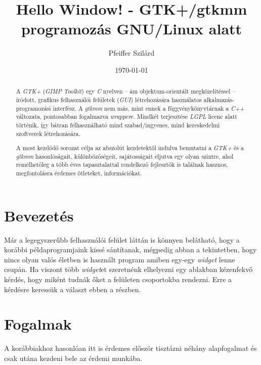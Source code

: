 \documentclass[a4paper,10pt]{article}
\title{Hello Window! - GTK+/gtkmm programozás GNU/Linux alatt}
\author{Pfeiffer Szilárd}
\date{\today}
\begin{document}

\begin{titlepage}

\maketitle

\begin{abstract}
A \textit{GTK+} (\textit{GIMP Toolkit}) egy \textit{C} nyelven -- ám objektum-orientált megközelítéssel -- íródott, grafikus felhasználói felületek (\textit{GUI}) létrehozására használatos alkalmazás-programozási interfész. A \textit{gtkmm} nem más, mint ennek a függvénykönyvtárnak a \textit{C++} változata, pontosabban fogalmazva \textit{wrapper}e. Mindkét terjesztése \textit{LGPL} licenc alatt történik, így bátran felhasználható mind szabad/ingyenes, mind kereskedelmi szoftverek létrehozására.

A most kezdődő sorozat célja az abszolút kezdetektől indulva bemutatni a \textit{GTK+} és a \textit{gtkmm} hasonlóságait, különbözőségeit, sajátosságait eljutva egy olyan szintre, ahol remélhetőleg a több éves tapasztalattal rendelkező fejlesztők is találnak hasznos, megfontolásra érdemes ötleteket, információkat.
\end{abstract}

\pagebreak

\tableofcontents

\end{titlepage}


\section{Bevezetés}

Már a legegyszerűbb felhasználói felület láttán is könnyen belátható, hogy a korábbi példaprogramjaink kissé sántítanak, mégpedig abban a tekintetben, hogy nincs olyan valós életben is használt program amiben egy-egy \textit{widget} lenne csupán. Ha viszont több \textit{widget}et szeretnénk elhelyezni egy ablakban kézenfekvő kérdés, hogy miként tudnák őket a felületen csoportokba rendezni. Erre a kérdésre keressük a választ ebben a részben.

\section{Fogalmak}

A korábbiakhoz hasonlóan itt is érdemes először tisztázni néhány alapfogalmat és csak utána kezdeni bele az érdemi munkába.
\end{document}
